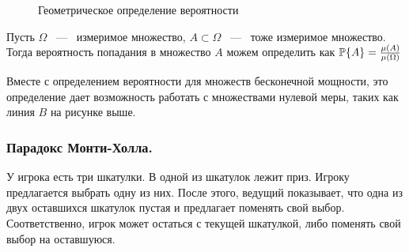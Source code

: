 \begin{figure}[ht]
    
    \centering
    \caption{Геометрическое определение вероятности}
\end{figure}

\begin{definition}[Геометрическое]
    Пусть $\Omega$ ~---~ измеримое множество, $A \subset \Omega$ ~---~ тоже измеримое множество. Тогда вероятность попадания в множество $A$ можем определить как $\P \{A\} = \frac{\mu(A)}{\mu(\Omega)}$
\end{definition}

\noindent Вместе с определением вероятности для множеств бесконечной мощности, это определение дает возможность работать с множествами нулевой меры, таких как линия $B$ на рисунке выше. 

\subsubsection{Парадокс Монти-Холла.}
\begin{problem}
    У игрока есть три шкатулки. В одной из шкатулок лежит приз. Игроку предлагается выбрать одну из них. После этого, ведущий показывает, что одна из двух оставшихся шкатулок пустая и предлагает поменять свой выбор. Соответственно, игрок может остаться с текущей шкатулкой, либо поменять свой выбор на оставшуюся. 
\end{problem}

